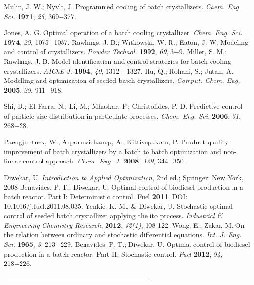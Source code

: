 \documentclass[a4paper, 11pt, oneside]{Thesis}  %
\begin{document}
\begin{thebibliography}{9}
Mulin, J. W.; Nyvlt, J. Programmed cooling of batch crystallizers.
\textit{Chem. Eng. Sci.} \textbf{1971}, \textit{26}, 369−377.

Jones, A. G. Optimal operation of a batch cooling crystallizer.
\textit{Chem. Eng. Sci.} \textbf{1974}, \textit{29}, 1075−1087.
 Rawlings, J. B.; Witkowski, W. R.; Eaton, J. W. Modeling and
control of crystallizers.\textit{ Powder Technol.} \textbf{1992}, \textit{69}, 3−9.
 Miller, S. M.; Rawlings, J. B. Model identification and control
strategies for batch cooling crystallizers. \textit{AIChE J.} \textbf{1994}, \textit{40}, 1312−
1327.
Hu, Q.; Rohani, S.; Jutan, A. Modelling and optimization of
seeded batch crystallizers. \textit{Comput. Chem. Eng.} \textbf{2005}, \textit{29}, 911−918.

Shi, D.; El-Farra, N.; Li, M.; Mhaskar, P.; Christofides, P. D.
Predictive control of particle size distribution in particulate processes.
\textit{Chem. Eng. Sci.} \textbf{2006}, \textit{61}, 268−28.

Paengjuntuek, W.; Arpornwichanop, A.; Kittisupakorn, P.
Product quality improvement of batch crystallizers by a batch to
batch optimization and non-linear control approach. \textit{Chem. Eng. J.}
\textbf{2008}, \textit{139}, 344−350.

Diwekar, U. \textit{Introduction to Applied Optimization}, 2nd ed.;
Springer: New York, 2008
Benavides, P. T.; Diwekar, U. Optimal control of biodiesel
production in a batch reactor. Part I: Deterministic control. Fuel \textbf{2011}, DOI: 10.1016/j.fuel.2011.08.035.
Yenkie, K. M., & Diwekar, U. Stochastic optimal control of seeded batch crystallizer applying the ito process. \textit{Industrial & Engineering Chemistry Research}, \textbf{2012}, \textit{52(1)}, 108-122.
Wong, E.; Zakai, M. On the relation between ordinary and
stochastic differential equations. \textit{Int. J. Eng. Sci.} \textbf{1965}, \textit{3}, 213−229.
Benavides, P. T.; Diwekar, U. Optimal control of biodiesel
production in a batch reactor. Part II: Stochastic control. \textit{Fuel} \textbf{2012}, \textit{94}, 218−226.


\end{thebibliography}
 ----------------------------------------------------------------
\label{Bibliography}
\end{document}
